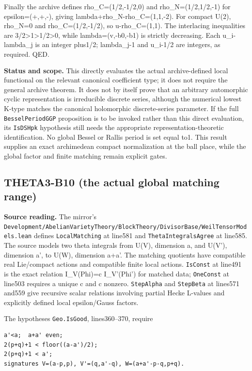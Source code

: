 Finally the archive defines rho\_C=(1/2,-1/2,0) and rho\_N=(1/2,1/2,-1) for epsilon=(+,+,-), giving lambda+rho\_N-rho\_C=(1,1,-2). For compact U(2), rho\_N=0 and rho\_C=(1/2,-1/2), so u-rho\_C=(1,1). The interlacing inequalities are 3/2\textgreater1\textgreater1/2\textgreater0, while lambda=(v,-b0,-b1) is strictly decreasing. Each u\_i-lambda\_j is an integer plus1/2; lambda\_j-1 and u\_i-1/2 are integers, as required. QED.

\textbf{Status and scope.} This directly evaluates the actual archive-defined local functional on the relevant canonical coefficient type; it does not require the general archive theorem. It does not by itself prove that an arbitrary automorphic cyclic representation is irreducible discrete series, although the numerical lowest K-type matches the canonical holomorphic discrete-series parameter. If the full \texttt{BesselPeriodGGP} proposition is to be invoked rather than this direct evaluation, its \texttt{IsDSHpk} hypothesis still needs the appropriate representation-theoretic identification. No global Bessel or Rallis period is set equal to1. This result supplies an exact archimedean compact normalization at the ball place, while the global factor and finite matching remain explicit gates.

\subsection{THETA3-B10 (the actual global matching range)}\label{theta3-b10-the-actual-global-matching-range}\label{B10}

\textbf{Source reading.} The mirror's \texttt{Development/AbelianVarietyTheory/BlockTheory/DivisorBase/WeilTensorModels.lean} defines \texttt{LocalMatching} at line581 and \texttt{ThetaIntegralsAgree} at line585. The source models two theta integrals from U(V), dimension a, and U(V'), dimension a', to U(W), dimension a+a'. The matching quotients have compatible real Lie/compact actions and compatible finite local actions. \texttt{IsConst} at line491 is the exact relation I\_V(Phi)=c I\_V'(Phi') for matched data; \texttt{OneConst} at line503 requires a unique c and c nonzero. \texttt{StepAlpha} and \texttt{StepBeta} at lines571 and559 give recursive scalar relations involving partial Hecke L-values and explicitly defined local epsilon/Gauss factors.

The hypotheses \texttt{Geo.IsGood}, lines360--370, require

\begin{verbatim}
a'<a;  a+a' even;
2(p+q)+1 < floor((a-a')/2);
2(p+q)+1 < a';
signatures V=(a-p,p), V'=(q,a'-q), W=(a+a'-p-q,p+q).
\end{verbatim}

